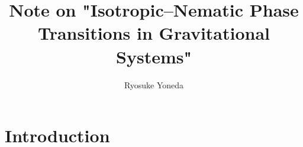 \documentclass[10pt, pre, twocolumn, showpacs, aps]{revtex4-1}
\begin{document}
\title{Note on "Isotropic–Nematic Phase Transitions in Gravitational Systems"}
\author{Ryosuke Yoneda}
\maketitle

\section{Introduction}
\end{document}
